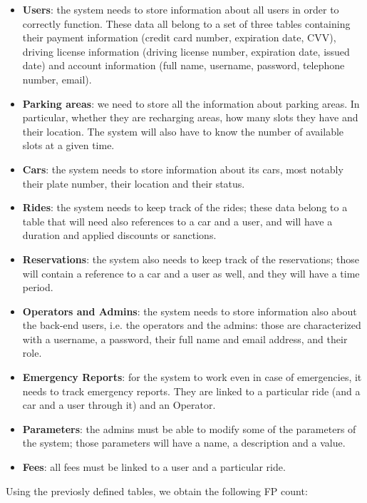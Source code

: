 \begin{itemize}
	\item \textbf{Users}: the system needs to store information about all users in order to correctly function. These data all belong to a set of three tables containing their payment information (credit card number, expiration date, CVV), driving license information (driving license number, expiration date, issued date) and account information (full name, username, password, telephone number, email). 
	\item \textbf{Parking areas}: we need to store all the information about parking areas. In particular, whether they are recharging areas, how many slots they have and their location. The system will also have to know the number of available slots at a given time.
	\item \textbf{Cars}: the system needs to store information about its cars, most notably their plate number, their location and their status.
	\item \textbf{Rides}: the system needs to keep track of the rides; these data belong to a table that will need also references to a car and a user, and will have a duration and applied discounts or sanctions. 
	\item \textbf{Reservations}: the system also needs to keep track of the reservations; those will contain a reference to a car and a user as well, and they will have a time period. 
	\item \textbf{Operators and Admins}: the system needs to store information also about the back-end users, i.e. the operators and the admins: those are characterized with a username, a password, their full name and email address, and their role.
	\item \textbf{Emergency Reports}: for the system to work even in case of emergencies, it needs to track emergency reports. They are linked to a particular ride (and a car and a user through it) and an Operator.
	\item \textbf{Parameters}: the admins must be able to modify some of the parameters of the system; those parameters will have a name, a description and a value.
	\item \textbf{Fees}: all fees must be linked to a user and a particular ride.
\end{itemize}

Using the previosly defined tables, we obtain the following FP count:\\

